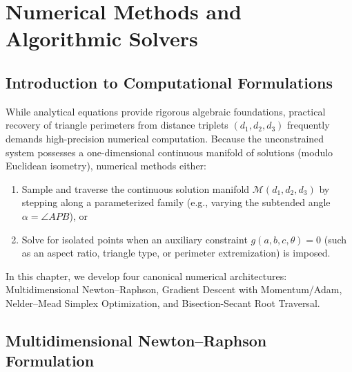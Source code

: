 \chapter{Numerical Methods and Algorithmic Solvers}
\label{ch:numerical-methods}

\section{Introduction to Computational Formulations}
While analytical equations provide rigorous algebraic foundations, practical recovery of triangle perimeters from distance triplets $(d_1, d_2, d_3)$ frequently demands high-precision numerical computation. Because the unconstrained system possesses a one-dimensional continuous manifold of solutions (modulo Euclidean isometry), numerical methods either:
\begin{enumerate}
    \item Sample and traverse the continuous solution manifold $\mathcal{M}(d_1, d_2, d_3)$ by stepping along a parameterized family (e.g., varying the subtended angle $\alpha = \angle APB$), or
    \item Solve for isolated points when an auxiliary constraint $g(a,b,c,\theta) = 0$ (such as an aspect ratio, triangle type, or perimeter extremization) is imposed.
\end{enumerate}

In this chapter, we develop four canonical numerical architectures: Multidimensional Newton--Raphson, Gradient Descent with Momentum/Adam, Nelder--Mead Simplex Optimization, and Bisection-Secant Root Traversal.

\section{Multidimensional Newton--Raphson Formulation}
